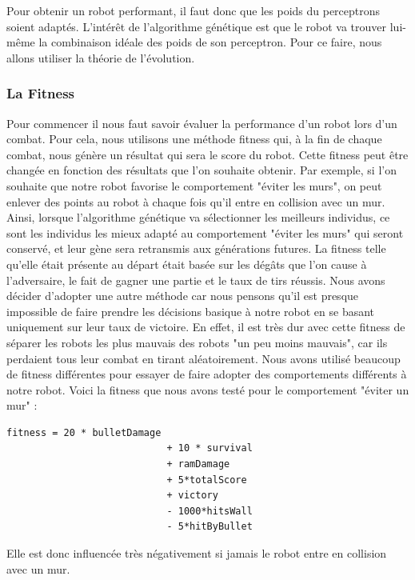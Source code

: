 \documentclass[a4paper,11pt]{article}
\begin{document}
Pour obtenir un robot performant, il faut donc que les poids du perceptrons soient adaptés. L'intérêt de l'algorithme génétique est que le robot va trouver lui-même la combinaison idéale des poids de son perceptron. Pour ce faire, nous allons utiliser la théorie de l'évolution.

\subsubsection{La Fitness}
Pour commencer il nous faut savoir évaluer la performance d'un robot lors d'un combat. Pour cela, nous utilisons une méthode fitness qui, à la fin de chaque combat, nous génère un résultat qui sera le score du robot. Cette fitness peut être changée en fonction des résultats que l'on souhaite obtenir. Par exemple, si l'on souhaite que notre robot favorise le comportement "éviter les murs", on peut enlever des points au robot à chaque fois qu'il entre en collision avec un mur. Ainsi, lorsque l'algorithme génétique va sélectionner les meilleurs individus, ce sont les individus les mieux adapté au comportement "éviter les murs" qui seront conservé, et leur gène sera retransmis aux générations futures. La fitness telle qu'elle était présente au départ était basée sur les dégâts que l'on cause à l'adversaire, le fait de gagner une partie et le taux de tirs réussis. Nous avons décider d'adopter une autre méthode car nous pensons qu'il est presque impossible de faire prendre les décisions basique à notre robot en se basant uniquement sur leur taux de victoire. En effet, il est très dur avec cette fitness de séparer les robots les plus mauvais des robots "un peu moins mauvais", car ils perdaient tous leur combat en tirant aléatoirement.
Nous avons utilisé beaucoup de fitness différentes pour essayer de faire adopter des comportements différents à notre robot. Voici la fitness que nous avons testé pour le comportement "éviter un mur" : 

\begin{lstlisting}
fitness = 20 * bulletDamage
                            + 10 * survival
                            + ramDamage
                            + 5*totalScore
                            + victory
                            - 1000*hitsWall
                            - 5*hitByBullet
 \end{lstlisting}
 Elle est donc influencée très négativement si jamais le robot entre en collision avec un mur.
\end{document}
